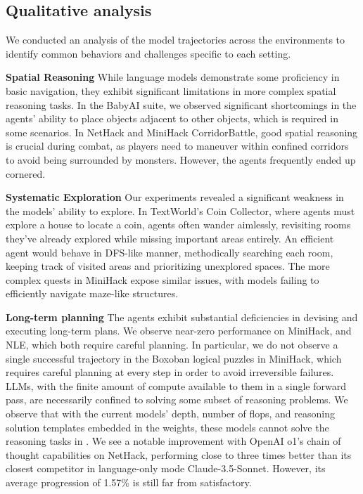\subsection{Qualitative analysis}
\label{sec:qualitative_analysis}
We conducted an analysis of the model trajectories across the environments to identify common behaviors and challenges specific to each setting.

\textbf{Spatial Reasoning} While language models demonstrate some proficiency in basic navigation, they exhibit significant limitations in more complex spatial reasoning tasks. In the BabyAI suite, we observed significant shortcomings in the agents' ability to place objects adjacent to other objects, which is required in some scenarios. In NetHack and MiniHack CorridorBattle, good spatial reasoning is crucial during combat, as players need to maneuver within confined corridors to avoid being surrounded by monsters. However, the agents frequently ended up cornered. %

\textbf{Systematic Exploration} Our experiments revealed a significant weakness in the models' ability to explore. In TextWorld's Coin Collector, where agents must explore a house to locate a coin, agents often wander aimlessly, revisiting rooms they've already explored while missing important areas entirely. An efficient agent would behave in DFS-like manner, methodically searching each room, keeping track of visited areas and prioritizing unexplored spaces. The more complex quests in MiniHack expose similar issues, with models failing to efficiently navigate maze-like structures.

\textbf{Long-term planning} The agents exhibit substantial deficiencies in devising and executing long-term plans. We observe near-zero performance on MiniHack, and NLE, which both require careful planning. In particular, we do not observe a single successful trajectory in the Boxoban logical puzzles in MiniHack, which requires careful  planning at every step in order to avoid irreversible failures.
LLMs, with the finite amount of compute available to them in a single forward pass, are necessarily confined to solving some subset of reasoning problems. We observe that with the current models' depth, number of flops, and reasoning solution templates embedded in the weights, these models cannot solve the reasoning tasks in \our{}. We see a notable improvement with OpenAI o1's chain of thought capabilities on NetHack, performing close to three times better than its closest competitor in language-only mode Claude-3.5-Sonnet. However, its average progression of 1.57\% is still far from satisfactory.

